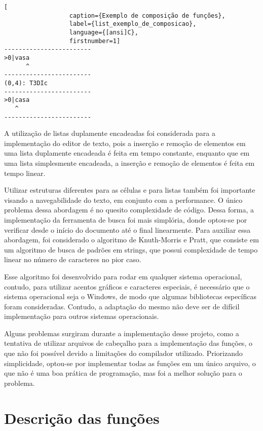 \documentclass[a4paper, 11pt]{article}
\begin{document}
\begin{center}
      \begin{minipage}{0.45\linewidth}
            \begin{lstlisting}[
                  caption={Exemplo de composição de funções}, 
                  label={list_exemplo_de_composicao}, 
                  language={[ansi]C},
                  firstnumber=1]
------------------------
>0|vasa
      ^
------------------------
(0,4): T3DIc
------------------------
>0|casa
   ^
------------------------
            \end{lstlisting}
      \end{minipage}
\end{center}

A utilização de listas duplamente encadeadas foi considerada para a implementação do editor de texto, pois a inserção e remoção de elementos em uma lista duplamente encadeada é feita em tempo constante, enquanto que em uma lista simplesmente encadeada, a inserção e remoção de elementos é feita em tempo linear. 

Utilizar estruturas diferentes para as células e para listas também foi importante visando a navegabilidade do texto, em conjunto com a performance. O único problema dessa abordagem é no quesito complexidade de código. Dessa forma, a implementação da ferramenta de busca foi mais simplória, donde optou-se por verificar desde o início do documento até o final linearmente. Para auxiliar essa abordagem, foi considerado o algoritmo de Knuth-Morris e Pratt, que consiste em um algoritmo de busca de padrões em strings, que possui complexidade de tempo linear no número de caracteres no pior caso.

Esse algoritmo foi desenvolvido para rodar em qualquer sistema operacional, contudo, para utilizar acentos gráficos e caracteres especiais, é necessário que o sistema operacional seja o Windows, de modo que algumas bibliotecas específicas foram consideradas. Contudo, a adaptação do mesmo não deve ser de difícil implementação para outros sistemas operacionais.

Alguns problemas surgiram durante a implementação desse projeto, como a tentativa de utilizar arquivos de cabeçalho para a implementação das funções, o que não foi possível devido a limitações do compilador utilizado. Priorizando simplicidade, optou-se por implementar todas as funções em um único arquivo, o que não é uma boa prática de programação, mas foi a melhor solução para o problema.


\section{Descrição das funções}
\end{document}
